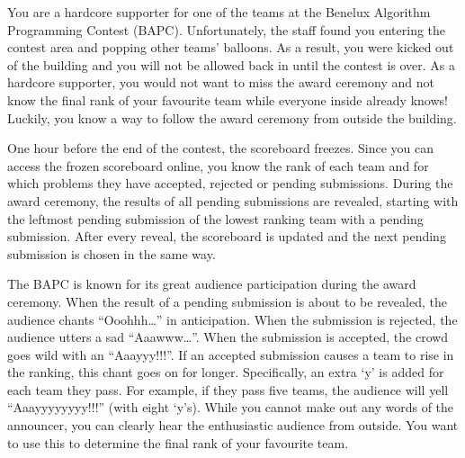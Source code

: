 




You are a hardcore supporter for one of the teams at the Benelux Algorithm Programming Contest (BAPC).
Unfortunately, the staff found you entering the contest area and popping
other teams' balloons. As a result, you were kicked out of the building
and you will not be allowed back in until the contest is over. As a
hardcore supporter, you would not want to miss the award
ceremony and not know the final rank of your favourite team while
everyone inside already knows! Luckily, you know a way to
follow the award ceremony from outside the building.

One hour before the end of the contest, the scoreboard freezes.
Since you can access the frozen scoreboard online,
you know the rank of each team and for
which problems they have accepted, rejected or pending submissions.
During the award ceremony, the results of all pending submissions are
revealed, starting with the leftmost pending submission of the lowest
ranking team with a pending submission. After every reveal, the
scoreboard is updated and the next pending submission is chosen in the
same way.

The BAPC is known for its great audience participation during the award
ceremony. When the result of a pending submission is about to be
revealed, the audience chants ``Ooohhh\ldots'' in anticipation. When the
submission is rejected, the audience utters a sad ``Aaawww\ldots''. When the
submission is accepted, the crowd goes wild with an ``Aaayyy!!!''. If
an accepted submission causes a team to rise in the ranking, this chant
goes on for longer. Specifically, an extra `y' is added for each team
they pass. For example, if they pass five teams, the audience will yell
``Aaayyyyyyyy!!!'' (with eight `y's). While you cannot make out any words of the
announcer, you can clearly hear the enthusiastic audience from outside.
You want to use this to determine the final rank of your favourite team.


